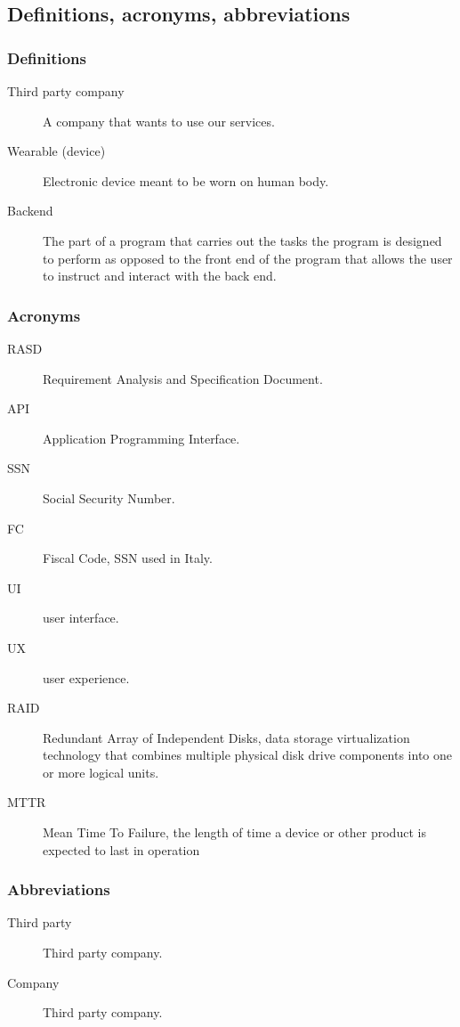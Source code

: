 \documentclass[../main.tex]{subfiles}
\begin{document}
\subsection{Definitions, acronyms, abbreviations}

\subsubsection{Definitions}
\begin{description}

	\item [Third party company] A company that wants to use our services.
	\item [Wearable (device)] Electronic device meant to be worn on human body.
	\item [Backend] The part of a program that carries out the tasks the program is designed to perform as opposed to the front end of the program that allows the user to instruct and interact with the back end.

\end{description}


\subsubsection{Acronyms}
\begin{description}

	\item [RASD] Requirement Analysis and Specification Document.
	\item [API] Application Programming Interface.
	\item [SSN] Social Security Number.
	\item [FC] Fiscal Code, SSN used in Italy.
	\item [UI] user interface.
	\item [UX] user experience.
	\item [RAID] Redundant Array of Independent Disks, data storage virtualization technology that combines multiple physical disk drive components into one or more logical units.
	\item [MTTR] Mean Time To Failure, the length of time a device or other product is expected to last in operation

\end{description}

\subsubsection{Abbreviations}
\begin{description}

	\item [Third party] Third party company.
	\item [Company] Third party company.

\end{description}
\end{document}
